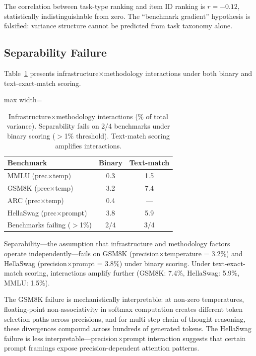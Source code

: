 \documentclass[11pt,twocolumn]{article}
\newcommand{\pct}{\%}
\begin{document}
The correlation between task-type ranking and item ID ranking is $r=-0.12$, statistically indistinguishable from zero. The ``benchmark gradient'' hypothesis is falsified: variance structure cannot be predicted from task taxonomy alone.

\subsection{Separability Failure}
\label{sec:separability}

Table~\ref{tab:separability} presents infrastructure$\times$methodology interactions under both binary and text-exact-match scoring.

\begin{table}[t]
\centering
\caption{Infrastructure$\times$methodology interactions (\pct{} of total variance). Separability fails on 2/4 benchmarks under binary scoring ($>$1\pct{} threshold). Text-match scoring amplifies interactions.}
\label{tab:separability}
\small
\begin{adjustbox}{max width=\columnwidth}
\begin{tabular}{@{}lcc@{}}
\toprule
\textbf{Benchmark} & \textbf{Binary} & \textbf{Text-match} \\
\midrule
MMLU (prec$\times$temp)      & 0.3 &  1.5 \\
GSM8K (prec$\times$temp)     & 3.2 &  7.4 \\
ARC (prec$\times$temp)       & 0.4 &  --- \\
HellaSwag (prec$\times$prompt) & 3.8 &  5.9 \\
\midrule
Benchmarks failing ($>$1\pct{}) & 2/4 & 3/4 \\
\bottomrule
\end{tabular}
\end{adjustbox}
\vspace{-2mm}
\end{table}

Separability---the assumption that infrastructure and methodology factors operate independently---fails on GSM8K (precision$\times$temperature = 3.2\pct{}) and HellaSwag (precision$\times$prompt = 3.8\pct{}) under binary scoring. Under text-exact-match scoring, interactions amplify further (GSM8K: 7.4\pct{}, HellaSwag: 5.9\pct{}, MMLU: 1.5\pct{}).

The GSM8K failure is mechanistically interpretable: at non-zero temperatures, floating-point non-associativity in softmax computation creates different token selection paths across precisions, and for multi-step chain-of-thought reasoning, these divergences compound across hundreds of generated tokens. The HellaSwag failure is less interpretable---precision$\times$prompt interaction suggests that certain prompt framings expose precision-dependent attention patterns.
\end{document}
